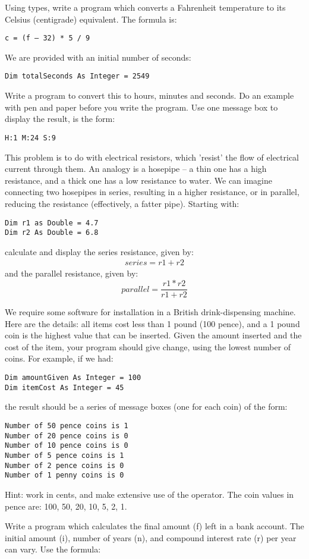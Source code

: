 \begin{enumChapter}
			\item	Using  types, write a program which converts a Fahrenheit temperature to its Celsius (centigrade) equivalent. The formula is:
				\begin{lstlisting}
c = (f – 32) * 5 / 9
				\end{lstlisting}
			\item	We are provided with an initial number of seconds:
				\begin{lstlisting}
Dim totalSeconds As Integer = 2549
				\end{lstlisting}
				Write a program to convert this to hours, minutes and seconds. Do an example with pen and paper before you write the program. Use one message box to display the result, is the form:
				\begin{lstlisting}
H:1 M:24 S:9
				\end{lstlisting}
			\item	This problem is to do with electrical resistors, which 'resist' the flow of electrical current through them. An analogy is a hosepipe – a thin one has a high resistance, and a thick one has a low resistance to water. We can imagine connecting two hosepipes in series, resulting in a higher resistance, or in parallel, reducing the resistance (effectively, a fatter pipe). Starting with:
				\begin{lstlisting}
Dim r1 as Double = 4.7
Dim r2 As Double = 6.8
				\end{lstlisting}
				calculate and display the series resistance, given by:
				\begin{align*}
					series = r1 + r2
				\end{align*}
				and the parallel resistance, given by:
				\begin{equation*}
					parallel = \frac{r1 * r2}{r1 + r2}
				\end{equation*}
			\item	We require some software for installation in a British drink-dispensing machine. Here are the details: all items cost less than 1 pound (100 pence), and a 1 pound coin is the highest value that can be inserted. Given the amount inserted and the cost of the item, your program should give change, using the lowest number of coins. For example, if we had:
				\begin{lstlisting}
Dim amountGiven As Integer = 100
Dim itemCost As Integer = 45
				\end{lstlisting}
				the result should be a series of message boxes (one for each coin) of the form:
				\begin{lstlisting}
Number of 50 pence coins is 1
Number of 20 pence coins is 0
Number of 10 pence coins is 0
Number of 5 pence coins is 1
Number of 2 pence coins is 0
Number of 1 penny coins is 0
				\end{lstlisting}
				Hint: work in cents, and make extensive use of the  operator. The coin values in pence are: 100, 50, 20, 10, 5, 2, 1.
			\item Write a program which calculates the final amount (f) left in a bank account. The initial amount (i), number of years (n), and compound interest rate (r) per year can vary. Use the formula:
				

\end{enumChapter}
